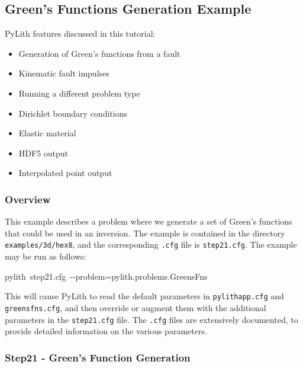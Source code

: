 
\subsection{\label{sec:example:3dhex8-greensfns}Green's Functions Generation
Example}

PyLith features discussed in this tutorial:
\begin{itemize}
\item Generation of Green's functions from a fault
\item Kinematic fault impulses
\item Running a different problem type
\item Dirichlet boundary conditions
\item Elastic material
\item HDF5 output
\item Interpolated point output
\end{itemize}

\subsubsection{Overview}

This example describes a problem where we generate a set of Green's
functions that could be used in an inversion. The example is contained
in the directory \texttt{examples/3d/hex8}, and the corresponding
\texttt{.cfg} file is \texttt{step21.cfg}. The example may be run
as follows:
\begin{lyxcode}
pylith~step21.cfg~-{}-problem=pylith.problems.GreensFns
\end{lyxcode}
This will cause PyLith to read the default parameters in \texttt{pylithapp.cfg}
and \texttt{greensfns.cfg}, and then override or augment them with
the additional parameters in the \texttt{step21.cfg} file. The \texttt{.cfg}
files are extensively documented, to provide detailed information
on the various parameters.


\subsubsection{Step21 - Green's Function Generation}

